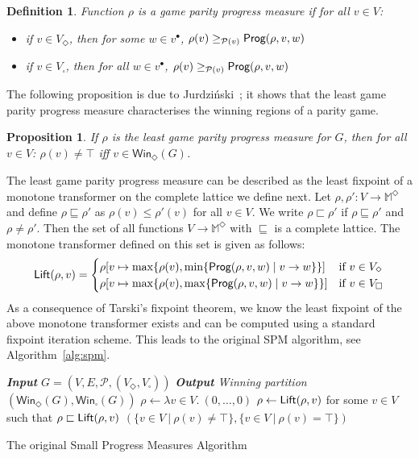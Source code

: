 \documentclass{eptcs}
\newtheorem{defi}{Definition}
\newtheorem{prop}{Proposition}
\newenvironment{definition}{\begin{defi} \rm }{\end{defi}}
\newenvironment{proposition}{\begin{prop} \rm }{\end{prop}}
\newcommand{\odd}{\ensuremath{\square}\xspace}
\newcommand{\even}{\ensuremath{\Diamond}\xspace}
\newcommand{\post}[1]{\ensuremath{#1^{\bullet}}}
\newcommand{\winsubodd}[1]{\textsf{Win}_{\odd}(#1)}
\newcommand{\winsubeven}[1]{\textsf{Win}_{\even}(#1)}
\newcommand{\priosym}{\mathcal{P}}
\newcommand{\prio}[1]{\priosym(#1)}
\begin{document}
\begin{definition} Function
$\rho$ is a \emph{game parity progress measure}
if for all $v \in V$:
\begin{itemize}
  \item if $v \in V_{\even}$, then for some $w \in \post{v}$, $\rho(v) \geq_{\prio{v}} \prog{\rho}{v}{w}$
  \item if $v \in V_{\odd}$, then for all $w \in \post{v}$, $\rho(v) \geq_{\prio{v}}\prog{\rho}{v}{w}$
\end{itemize}
\end{definition}
The following proposition is due to Jurdzi\'nski~\cite{Jur:00}; it shows that
the least game parity progress measure characterises the winning regions of a
parity game.

\begin{proposition}\label{prop:jurdzinski}
If $\rho$ is the \emph{least} game parity progress measure for $G$, 
then for all $v \in V$:
$\rho(v) \neq \top$ iff $v \in \winsubeven{G}$.
\end{proposition}
The least game parity progress measure can be described as the least fixpoint
of a monotone transformer on the complete lattice we define next. Let
$\rho,\rho' {:} V \to \mathbb{M}^\even$ and define
$\rho \sqsubseteq \rho'$ as $\rho(v) \leq \rho'(v)$ for all $v \in V$. We write
$\rho \sqsubset \rho'$ if $\rho \sqsubseteq \rho'$ and $\rho \not= \rho'$. Then
the set of all functions $V \to \mathbb{M}^\even$ with $\sqsubseteq$ is a complete
lattice. The monotone transformer defined on this set is given as follows:
\[
\lift{\rho}{v} = \begin{cases}
\rho[v \mapsto \max \{ \rho(v), \min\{ \prog{\rho}{v}{w} \mid v \to w \} \}] &
\text{if $v \in V_{\even}$}\\
\rho[v \mapsto \max \{ \rho(v), \max\{ \prog{\rho}{v}{w} \mid v \to w \} \}] &
\text{if $v \in V_{\odd}$}
\end{cases}
\]
As a consequence of Tarski's fixpoint theorem, we know the least fixpoint of the
above monotone transformer exists and can be computed using a standard fixpoint iteration
scheme. This leads to the original SPM algorithm, see Algorithm~\ref{alg:spm}.
\begin{algorithm}[h!t]
\begin{algorithmic}[1]
\State \emph{\textbf{Input} $G = (V, E, \priosym, (V_\even, V_\odd))$}
\State \emph{\textbf{Output} Winning partition $(\winsubeven{G},\winsubodd{G})$}
\State $\rho  \gets \lambda v \in V.~(0, \dots, 0)$
  \State $\rho \gets \textsf{Lift}(\rho,v)$ for some $v \in V$ such that $\rho \sqsubset \textsf{Lift}(\rho,v)$
\EndWhile
\State \Return $(\{v \in V ~|~ \rho(v) \not= \top\}, \{v \in V ~|~ \rho(v) = \top\})$
\EndFunction
\end{algorithmic}
\caption{The original Small Progress Measures Algorithm}
\label{alg:spm}
\end{algorithm}
\end{document}

